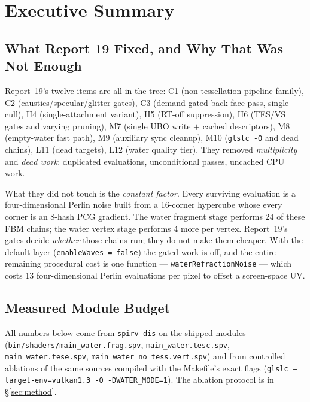 \documentclass[11pt,a4paper]{article}
\begin{document}
\tableofcontents
\newpage

\section{Executive Summary}

\subsection{What Report 19 Fixed, and Why That Was Not Enough}

Report~19's twelve items are all in the tree: C1 (non-tessellation pipeline family), C2 (caustics/specular/glitter
gates), C3 (demand-gated back-face pass, single cull), H4 (single-attachment variant), H5 (RT-off suppression), H6
(TES/VS gates and varying pruning), M7 (single UBO write $+$ cached descriptors), M8 (empty-water fast path), M9
(auxiliary sync cleanup), M10 (\texttt{glslc -O} and dead chains), L11 (dead targets), L12 (water quality tier). They
removed \emph{multiplicity} and \emph{dead work}: duplicated evaluations, unconditional passes, uncached CPU work.

What they did not touch is the \emph{constant factor}. Every surviving evaluation is a four-dimensional Perlin noise
built from a 16-corner hypercube whose every corner is an 8-hash PCG gradient. The water fragment stage performs 24 of
these FBM chains; the water vertex stage performs 4 more per vertex. Report~19's gates decide \emph{whether} those chains
run; they do not make them cheaper. With the default layer (\texttt{enableWaves = false}) the gated work is off, and the
entire remaining procedural cost is one function --- \texttt{waterRefractionNoise} --- which costs 13 four-dimensional
Perlin evaluations per pixel to offset a screen-space UV.

\subsection{Measured Module Budget}

All numbers below come from \texttt{spirv-dis} on the shipped modules (\texttt{bin/shaders/main\_water.frag.spv},
\texttt{main\_water.tesc.spv}, \texttt{main\_water.tese.spv}, \texttt{main\_water\_no\_tess.vert.spv}) and from
controlled ablations of the same sources compiled with the Makefile's exact flags
(\texttt{glslc --target-env=vulkan1.3 -O -DWATER\_MODE=1}). The ablation protocol is in \S\ref{sec:method}.
\end{document}

